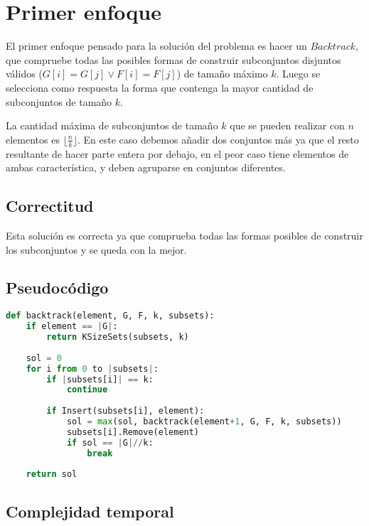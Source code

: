 \documentclass{article}
\begin{document}
\section*{Primer enfoque}

El primer enfoque pensado para la solución del problema es hacer un $Backtrack$, que
compruebe todas las posibles formas de construir subconjuntos disjuntos
válidos ($G[i] = G[j] \vee F[i] = F[j]$) de tamaño máximo $k$. Luego se selecciona como 
respuesta la forma que contenga la mayor cantidad de subconjuntos de tamaño $k$.

La cantidad máxima de subconjuntos de tamaño $k$ que se pueden realizar con $n$ elementos
es $\lfloor \frac{n}{k} \rfloor$. En este caso debemos añadir dos conjuntos más ya que 
el resto resultante de hacer parte entera por debajo, en el peor caso tiene elementos de 
ambas característica, y deben agruparse en conjuntos diferentes. 

\subsection*{Correctitud}

Esta solución es correcta ya que comprueba todas las formas posibles de construir los subconjuntos
y se queda con la mejor. 

\subsection*{Pseudocódigo}

\begin{lstlisting}[language = Python]
def backtrack(element, G, F, k, subsets):
    if element == |G|:
        return KSizeSets(subsets, k)
    
    sol = 0
    for i from 0 to |subsets|:
        if |subsets[i]| == k:
            continue
        
        if Insert(subsets[i], element):
            sol = max(sol, backtrack(element+1, G, F, k, subsets))
            subsets[i].Remove(element)
            if sol == |G|//k:
                break
    
    return sol

\end{lstlisting}

\subsection*{Complejidad temporal}

\end{document}
